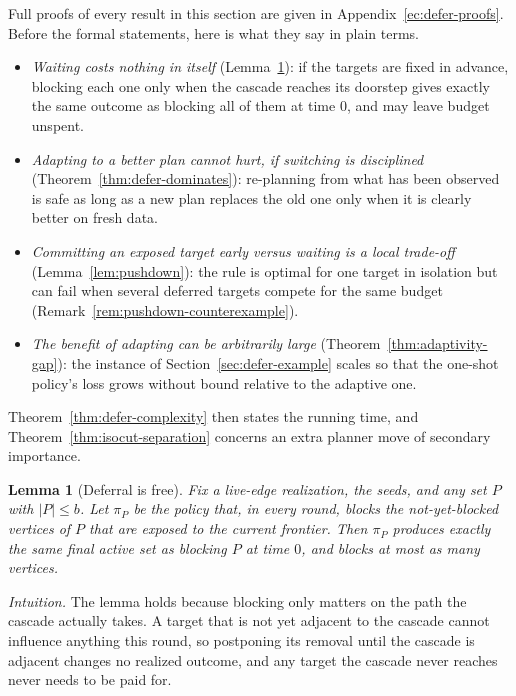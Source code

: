 \documentclass[11pt]{article}
\newtheorem{lemma}{Lemma}
\theoremstyle{definition}
\theoremstyle{remark}
\begin{document}
Full proofs of every result in this section are given in
Appendix~\ref{ec:defer-proofs}. Before the formal statements, here
is what they say in plain terms.
\begin{itemize}
\item \emph{Waiting costs nothing in itself} (Lemma~\ref{lem:defer-free}):
  if the targets are fixed in advance, blocking each one only when the
  cascade reaches its doorstep gives exactly the same outcome as blocking
  all of them at time $0$, and may leave budget unspent.
\item \emph{Adapting to a better plan cannot hurt, if switching is
  disciplined} (Theorem~\ref{thm:defer-dominates}): re-planning from what
  has been observed is safe as long as a new plan replaces the old one only
  when it is clearly better on fresh data.
\item \emph{Committing an exposed target early versus waiting is a
  local trade-off} (Lemma~\ref{lem:pushdown}): the rule is optimal for one
  target in isolation but can fail when several deferred targets compete for
  the same budget (Remark~\ref{rem:pushdown-counterexample}).
\item \emph{The benefit of adapting can be arbitrarily large}
  (Theorem~\ref{thm:adaptivity-gap}): the instance of
  Section~\ref{sec:defer-example} scales so that the one-shot policy's
  loss grows without bound relative to the adaptive one.
\end{itemize}
Theorem~\ref{thm:defer-complexity} then states the running time, and
Theorem~\ref{thm:isocut-separation} concerns an extra planner move of
secondary importance.

\begin{lemma}[Deferral is free]\label{lem:defer-free}
Fix a live-edge realization, the seeds, and any set $P$ with $|P|\le b$. Let
$\pi_P$ be the policy that, in every round, blocks the not-yet-blocked
vertices of $P$ that are exposed to the current frontier. Then $\pi_P$
produces exactly the same final active set as blocking $P$ at time $0$, and
blocks at most as many vertices.
\end{lemma}

\emph{Intuition.} The lemma holds because blocking only matters on the
path the cascade actually takes. A target that is not yet adjacent to the
cascade cannot influence anything this round, so postponing its removal until
the cascade is adjacent changes no realized outcome, and any target the
cascade never reaches never needs to be paid for.
\end{document}
